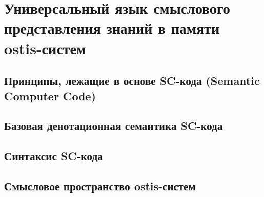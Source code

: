 \chapter{Универсальный язык смыслового представления знаний в памяти ostis-систем}
\label{chapter_sc_code}


\section{Принципы, лежащие в основе SC-кода (Semantic Computer Code)}
\section{Базовая денотационная семантика SC-кода}
\section{Синтаксис SC-кода}
\section{Смысловое пространство ostis-систем}

%